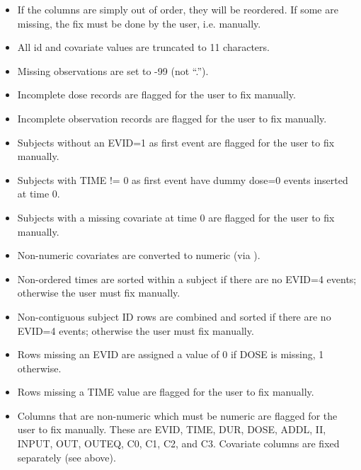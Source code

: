 \documentclass[a4paper]{book}
\begin{document}
\begin{Details}
\begin{itemize}
\item{} If the columns are simply out of order, they will be reordered.  If some are missing, the fix must
be done by the user, i.e. manually.
\item{} All id and covariate values are truncated to 11 characters.
\item{} Missing observations are set to -99 (not ``.'').
\item{} Incomplete dose records are flagged for the user to fix manually.
\item{} Incomplete observation records are flagged for the user to fix manually.
\item{} Subjects without an EVID=1 as first event are flagged for the user to fix manually.
\item{} Subjects with TIME != 0 as first event have dummy dose=0 events inserted at time 0.
\item{} Subjects with a missing covariate at time 0 are flagged for the user to fix manually.
\item{} Non-numeric covariates are converted to numeric (via ).
\item{} Non-ordered times are sorted within a subject if there are no EVID=4 events; otherwise the
user must fix manually.
\item{} Non-contiguous subject ID rows are combined and sorted if there are no EVID=4 events; otherwise the
user must fix manually.
\item{} Rows missing an EVID are assigned a value of 0 if DOSE is  missing, 1 otherwise.
\item{} Rows missing a TIME value are flagged for the user to fix manually.
\item{} Columns that are non-numeric which must be numeric are flagged for the user to fix manually.
These are EVID, TIME, DUR, DOSE, ADDL, II, INPUT, OUT, OUTEQ, C0, C1, C2, and C3.  
Covariate columns are fixed separately (see above).

\end{itemize}

\end{Details}
%
\end{document}
